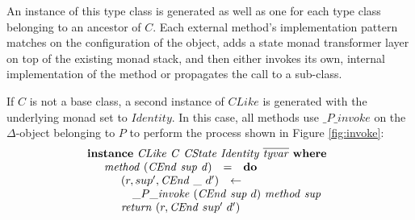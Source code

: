 An instance of this type class is generated as well as one for each type class belonging to an ancestor of $C$. Each external method's implementation pattern matches on the configuration of the object, adds a state monad transformer layer on top of the existing monad stack, and then either invokes its own, internal implementation of the method or propagates the call to a sub-class.

If $C$ is not a base class, a second instance of $\mathit{CLike}$ is generated with the underlying monad set to $\mathit{Identity}$. In this case, all methods use $\_P\_\mathit{invoke}$ on the $\Delta$-object belonging to $P$ to perform the process shown in Figure \ref{fig:invoke}:
\begin{displaymath}
\begin{array}{l}
\mathbf{instance}~\mathit{CLike}~\mathit{C}~\mathit{CState}~\mathit{Identity}~\overline{\mathit{tyvar}}~\mathbf{where}\\
\quad \begin{array}{lcl}
\mathit{method}~(\mathit{CEnd}~\mathit{sup}~\mathit{d}) & = & \mathbf{do} \\
\multicolumn{3}{l}{\quad \begin{array}{lcl}
    (r,sup',\mathit{CEnd}~\_~d') & \leftarrow & \\ 
    \multicolumn{3}{l}{ \quad \_P\_\mathit{invoke}~(\mathit{CEnd}~\mathit{sup}~d)~\mathit{method}~\mathit{sup} }\\
    \multicolumn{3}{l}{\mathit{return}~(r, \mathit{CEnd}~sup'~d')}
    \end{array}}
\end{array}
\end{array}
\end{displaymath}
